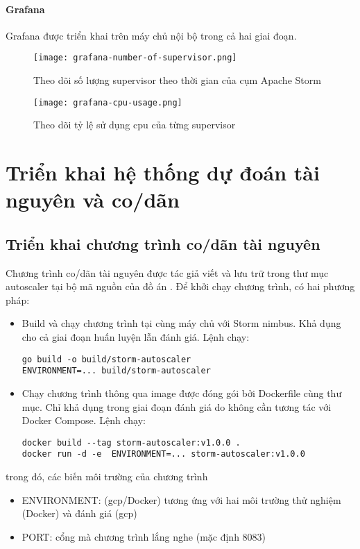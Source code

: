 \paragraph{Grafana}
Grafana được triển khai trên máy chủ nội bộ trong cả hai giai đoạn.

\begin{center}
    \begin{figure}[H]
        \texttt{[image: grafana-number-of-supervisor.png]}
        \caption{Theo dõi số lượng supervisor theo thời gian của cụm Apache Storm}
    \end{figure}

    \begin{figure}[H]
        \texttt{[image: grafana-cpu-usage.png]}
        \caption{Theo dõi tỷ lệ sử dụng \gls{cpu} của từng supervisor}
    \end{figure}
\end{center}

\section{Triển khai hệ thống dự đoán tài nguyên và co/dãn}

\subsection{Triển khai chương trình co/dãn tài nguyên}

Chương trình co/dãn tài nguyên được tác giả viết và lưu trữ trong thư mục autoscaler tại bộ mã nguồn của đồ án \autocite{lemionday_thesis_storm}. Để khởi chạy chương trình, có hai phương pháp:

\begin{itemize}
    \item Build và chạy chương trình tại cùng máy chủ với Storm nimbus. Khả dụng cho cả giai đoạn huấn luyện lẫn đánh giá. Lệnh chạy:
          \begin{verbatim}
go build -o build/storm-autoscaler
ENVIRONMENT=... build/storm-autoscaler
    \end{verbatim}
    \item Chạy chương trình thông qua image được đóng gói bởi Dockerfile cùng thư mục. Chỉ khả dụng trong giai đoạn đánh giá do không cần tương tác với Docker Compose. Lệnh chạy:
          \begin{verbatim}
docker build --tag storm-autoscaler:v1.0.0 .
docker run -d -e  ENVIRONMENT=... storm-autoscaler:v1.0.0
    \end{verbatim}
\end{itemize}
trong đó, các biến môi trường của chương trình
\begin{itemize}
    \item ENVIRONMENT: (\gls{gcp}/Docker) tương ứng với hai môi trường thử nghiệm (Docker) và đánh giá (\gls{gcp})
    \item PORT: cổng mà chương trình lắng nghe (mặc định 8083)
\end{itemize}

